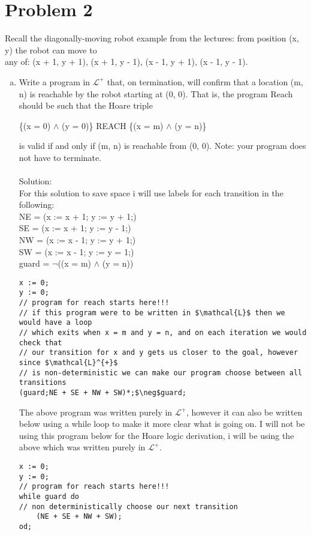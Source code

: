 \documentclass{article}
\newcommand*\moveToRight[1]{\hspace*{0em plus 1fill}\makebox{(#1)}}
\begin{document}
\newpage
\section{Problem 2}
Recall the diagonally-moving robot example from the lectures: from position (x, y) the robot can move to\\
any of: (x + 1, y + 1), (x + 1, y - 1), (x - 1, y + 1), (x - 1, y - 1).
\begin{enumerate}[(a)]
    \item Write a program in $\mathcal{L}^{+}$ that, on termination, will confirm that a location (m, n) is reachable by the robot starting at (0, 0). That is, the program Reach should be such that the Hoare triple
    \begin{center}\{(x = 0) $\land$ (y = 0)\} REACH \{(x = m) $\land$ (y = n)\}\end{center}
    is valid if and only if (m, n) is reachable from (0, 0). Note: your program does not have to terminate.\moveToRight{14 marks}\\\\
    Solution:\\
    For this solution to save space i will use labels for each transition in the following:\\
    NE = (x := x + 1; y := y + 1;)\\
    SE = (x := x + 1; y := y - 1;)\\
    NW = (x := x - 1; y := y + 1;)\\
    SW = (x := x - 1; y := y = 1;)\\
    guard = $\neg$((x = m) $\land$ (y = n))
    \begin{lstlisting}[language=Maple,mathescape=true]
x := 0;
y := 0;
// program for reach starts here!!!
// if this program were to be written in $\mathcal{L}$ then we would have a loop
// which exits when x = m and y = n, and on each iteration we would check that 
// our transition for x and y gets us closer to the goal, however since $\mathcal{L}^{+}$
// is non-deterministic we can make our program choose between all transitions
(guard;NE + SE + NW + SW)*;$\neg$guard;
    \end{lstlisting}    
The above program was written purely in $\mathcal{L}^{+}$, however it can also be written below using a while loop to make it more clear what is going on. I will not be using this program below for the Hoare logic derivation, i will be using the above which was written purely in $\mathcal{L}^{+}$.
    \begin{lstlisting}[language=Maple,mathescape=true]
x := 0;
y := 0;
// program for reach starts here!!!
while guard do
// non deterministically choose our next transition
    (NE + SE + NW + SW);
od;
    \end{lstlisting}   
    

\end{enumerate}
\end{document}
